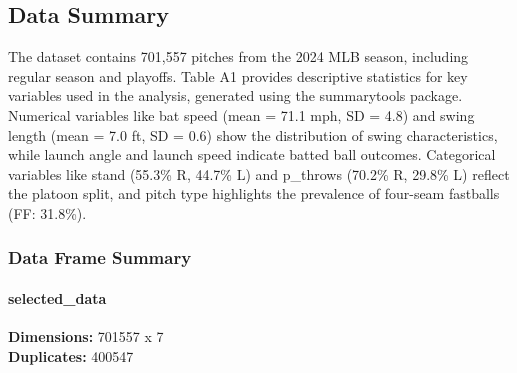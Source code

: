 \documentclass[
]{article}
\begin{document}
\hypertarget{data-summary}{%
\subsection{Data Summary}\label{data-summary}}

The dataset contains 701,557 pitches from the 2024 MLB season, including
regular season and playoffs. Table A1 provides descriptive statistics
for key variables used in the analysis, generated using the summarytools
package. Numerical variables like bat speed (mean = 71.1 mph, SD = 4.8)
and swing length (mean = 7.0 ft, SD = 0.6) show the distribution of
swing characteristics, while launch angle and launch speed indicate
batted ball outcomes. Categorical variables like stand (55.3\% R, 44.7\%
L) and p\_throws (70.2\% R, 29.8\% L) reflect the platoon split, and
pitch type highlights the prevalence of four-seam fastballs (FF:
31.8\%).

\hypertarget{data-frame-summary}{%
\subsubsection{Data Frame Summary}\label{data-frame-summary}}

\hypertarget{selected_data}{%
\paragraph{selected\_data}\label{selected_data}}

\textbf{Dimensions:} 701557 x 7\\
\textbf{Duplicates:} 400547
\end{document}
